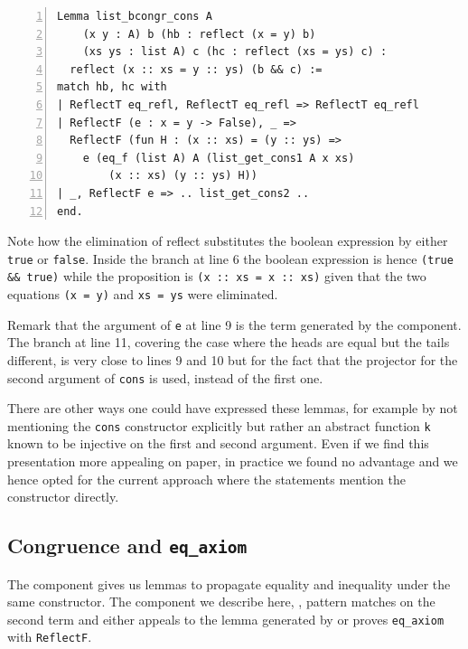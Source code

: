 \documentclass[sigplan,10pt,review]{acmart}\settopmatter{printfolios=true,printccs=false,printacmref=false}
\newcommand{\derive}[1]{\keys{#1}}
\begin{document}
\begin{minipage}{\textwidth}\begin{lstlisting}[numbers=left]
Lemma list_bcongr_cons A 
    (x y : A) b (hb : reflect (x = y) b)
    (xs ys : list A) c (hc : reflect (xs = ys) c) :
  reflect (x :: xs = y :: ys) (b && c) :=
match hb, hc with
| ReflectT eq_refl, ReflectT eq_refl => ReflectT eq_refl
| ReflectF (e : x = y -> False), _ =>
  ReflectF (fun H : (x :: xs) = (y :: ys) =>
    e (eq_f (list A) A (list_get_cons1 A x xs)
        (x :: xs) (y :: ys) H))
| _, ReflectF e => .. list_get_cons2 ..
end.
\end{lstlisting}\end{minipage}

\noindent
Note how the elimination of reflect substitutes the boolean expression
by either \lstinline+true+ or \lstinline+false+. Inside the branch
at line 6 the boolean expression is hence \lstinline+(true && true)+
while the proposition is \lstinline+(x :: xs = x :: xs)+ given that
the two equations \lstinline+(x = y)+ and \lstinline+xs = ys+
were eliminated.

Remark that the argument of \lstinline+e+ at line 9
is the term generated by the \derive{injection} component.
The branch at line 11, covering the case where
the heads are equal but the tails different, is very close
to lines 9 and 10 but for the fact that the projector for
the second argument of \lstinline+cons+ is used, instead of the
first one.

There are other ways one could have expressed these lemmas,
for example by not mentioning the \lstinline+cons+
constructor explicitly but rather an abstract function \lstinline+k+
known to be injective on the first and second argument.
Even if we find this presentation more appealing on paper, in practice
we found no advantage and we hence opted for the current approach
where the statements mention the constructor directly.

\subsection{Congruence and \lstinline+eq_axiom+} %

The \derive{bcongr} component gives us lemmas to propagate
equality and inequality under the same constructor. The component
we describe here, \derive{eqK}, pattern matches on the second term
and either appeals to the lemma generated by \derive{bcongr} or
proves \lstinline+eq_axiom+ with \lstinline+ReflectF+.
\end{document}
